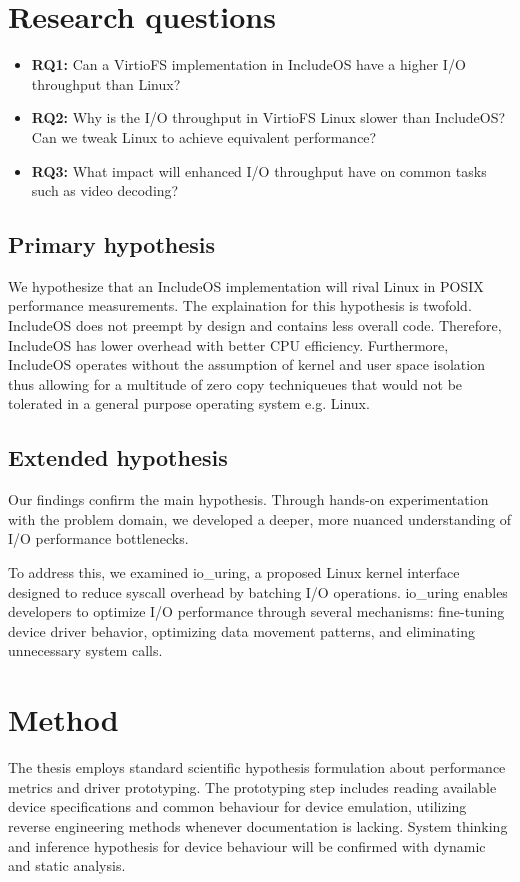 
\section{Research questions}
\begin{itemize}
    \item \textbf{RQ1:} Can a VirtioFS implementation in IncludeOS have a higher I/O throughput than Linux?
    \item \textbf{RQ2:} Why is the I/O throughput in VirtioFS Linux slower than IncludeOS? Can we tweak Linux to achieve equivalent performance?
    \item \textbf{RQ3:} What impact will enhanced I/O throughput have on common tasks such as video decoding?
\end{itemize}

\subsection{Primary hypothesis}
We hypothesize that an IncludeOS implementation will rival Linux in POSIX performance measurements. The explaination for this hypothesis is twofold. IncludeOS does not preempt by design and contains less overall code. Therefore, IncludeOS has lower overhead with better CPU efficiency. Furthermore, IncludeOS operates without the assumption of kernel and user space isolation thus allowing for a multitude of zero copy techniqueues that would not be tolerated in a general purpose operating system e.g. Linux.

\subsection{Extended hypothesis}
Our findings confirm the main hypothesis. Through hands-on experimentation with the problem domain, we developed a deeper, more nuanced understanding of I/O performance bottlenecks.

To address this, we examined io\_uring, a proposed Linux kernel interface designed to reduce syscall overhead by batching I/O operations. io\_uring enables developers to optimize I/O performance through several mechanisms: fine-tuning device driver behavior, optimizing data movement patterns, and eliminating unnecessary system calls.

\section{Method}
The thesis employs standard scientific hypothesis formulation about performance metrics and driver prototyping. The prototyping step includes reading available device specifications and common behaviour for device emulation, utilizing reverse engineering methods whenever documentation is lacking. System thinking and inference hypothesis for device behaviour will be confirmed with dynamic and static analysis.
